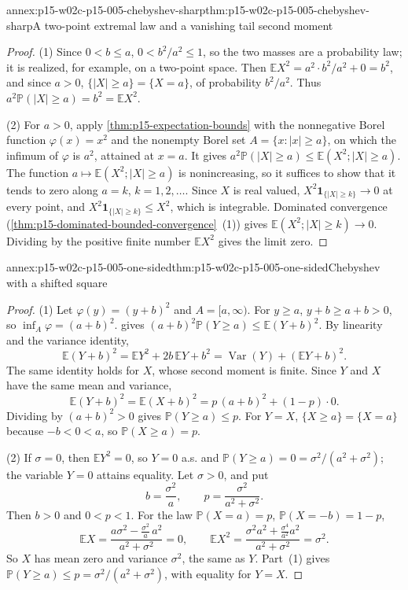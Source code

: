 \begin{annexitem}{annex:p15-w02c-p15-005-chebyshev-sharp}{thm:p15-w02c-p15-005-chebyshev-sharp}{A two-point extremal law and a vanishing tail second moment}
\begin{proof}
(1) Since \(0<b\leq a\), \(0<b^2/a^2\leq1\), so the two masses are a
probability law; it is realized, for example, on a two-point space.
Then \(\mathbb EX^2=a^2\cdot b^2/a^2+0=b^2\), and since \(a>0\),
\(\{|X|\geq a\}=\{X=a\}\), of probability \(b^2/a^2\). Thus
\(a^2\mathbb P(|X|\geq a)=b^2=\mathbb EX^2\).

(2) For \(a>0\), apply \cref{thm:p15-expectation-bounds} with the
nonnegative Borel function \(\varphi(x)=x^2\) and the nonempty Borel
set \(A=\{x:|x|\geq a\}\), on which the infimum of \(\varphi\) is
\(a^2\), attained at \(x=a\). It gives
\(a^2\mathbb P(|X|\geq a)\leq\mathbb E(X^2;|X|\geq a)\). The function
\(a\mapsto\mathbb E(X^2;|X|\geq a)\) is nonincreasing, so it suffices to
show that it tends to zero along \(a=k\), \(k=1,2,\ldots\). Since \(X\)
is real valued, \(X^2\mathbf1_{\{|X|\geq k\}}\to0\) at every point, and
\(X^2\mathbf1_{\{|X|\geq k\}}\leq X^2\), which is integrable. Dominated
convergence (\cref{thm:p15-dominated-bounded-convergence}~(1)) gives
\(\mathbb E(X^2;|X|\geq k)\to0\). Dividing by the positive finite
number \(\mathbb EX^2\) gives the limit zero.
\end{proof}
\end{annexitem}

\begin{annexitem}{annex:p15-w02c-p15-005-one-sided}{thm:p15-w02c-p15-005-one-sided}{Chebyshev with a shifted square}
\begin{proof}
(1) Let \(\varphi(y)=(y+b)^2\) and \(A=[a,\infty)\). For \(y\geq a\),
\(y+b\geq a+b>0\), so \(\inf_A\varphi=(a+b)^2\).
 gives
\((a+b)^2\mathbb P(Y\geq a)\leq\mathbb E(Y+b)^2\). By linearity and the
variance identity,
\[
 \mathbb E(Y+b)^2=\mathbb EY^2+2b\,\mathbb EY+b^2
 =\operatorname{Var}(Y)+(\mathbb EY+b)^2 .
\]
The same identity holds for \(X\), whose second moment is finite. Since
\(Y\) and \(X\) have the same mean and variance,
\[
 \mathbb E(Y+b)^2=\mathbb E(X+b)^2=p\,(a+b)^2+(1-p)\cdot0 .
\]
Dividing by \((a+b)^2>0\) gives \(\mathbb P(Y\geq a)\leq p\). For
\(Y=X\), \(\{X\geq a\}=\{X=a\}\) because \(-b<0<a\), so
\(\mathbb P(X\geq a)=p\).

(2) If \(\sigma=0\), then \(\mathbb EY^2=0\), so \(Y=0\) a.s. and
\(\mathbb P(Y\geq a)=0=\sigma^2/(a^2+\sigma^2)\); the variable \(Y=0\)
attains equality. Let \(\sigma>0\), and put
\[
 b=\frac{\sigma^2}a,\qquad p=\frac{\sigma^2}{a^2+\sigma^2}.
\]
Then \(b>0\) and \(0<p<1\). For the law \(\mathbb P(X=a)=p\),
\(\mathbb P(X=-b)=1-p\),
\[
 \mathbb EX=\frac{a\sigma^2-\frac{\sigma^2}a\,a^2}{a^2+\sigma^2}=0,
 \qquad
 \mathbb EX^2=\frac{\sigma^2a^2+\frac{\sigma^4}{a^2}a^2}{a^2+\sigma^2}
 =\sigma^2 .
\]
So \(X\) has mean zero and variance \(\sigma^2\), the same as \(Y\).
Part~(1) gives \(\mathbb P(Y\geq a)\leq p=\sigma^2/(a^2+\sigma^2)\), with
equality for \(Y=X\).
\end{proof}
\end{annexitem}

